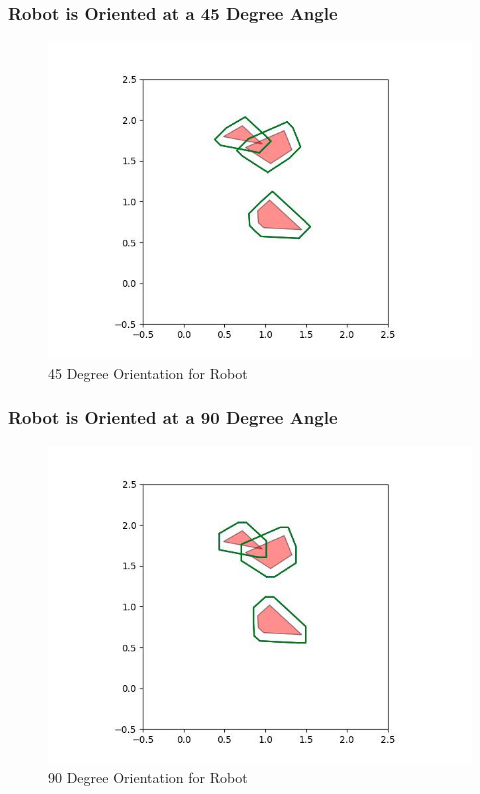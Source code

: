 \documentclass{article}
\begin{document}
\subsubsection{Robot is Oriented at a 45 Degree Angle}
\begin{figure}[h!]
	\includegraphics[width= 0.9 \linewidth]{Problem3_minkowski1_45.jpg}
	\centering
	\caption{45 Degree Orientation for Robot}
	\label{Problem3_minkowski1_45.jpg}
\end{figure}

\newpage
\subsubsection{Robot is Oriented at a 90 Degree Angle}
\begin{figure}[h!]
	\includegraphics[width= 0.9 \linewidth]{Problem3_minkowski1_90.jpg}
	\centering
	\caption{90 Degree Orientation for Robot}
	\label{Problem3_minkowski1_90.jpg}
\end{figure}
\end{document}

